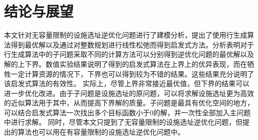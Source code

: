 \documentclass[UTF8]{article}
\begin{document}
%
%


\section{结论与展望}

本文针对无容量限制的设施选址逆优化问题进行了建模分析，提出了使用行生成算法得到最优解以及通过对整数规划进行线性松弛而得到启发式方法。分析表明对于行生成算法中的子问题采取不同的计算方法可以分别得到逆优化问题的最优解以及解的上下界。数值实验结果说明了得到的启发式算法在上界上的优异表现，而在牺牲一定计算资源的情况下，下界也可以得到较为不错的结果。这些结果充分说明了该启发式算法的有效性。
实际上，尽管上界非常接近最优值，但下界的结果可以进一步优化改进。由于子问题是设施选址的原问题，可以将求解设施选址更为高效的近似算法用于其中，从而提高下界解的质量。子问题是最具有优化空间的地方，可以结合启发式算法一次找出多个目标函数小于0的解，并一次性全部加入主问题中进行求解。
同时，尽管本文只提到了无容量限制的设施选址逆优化问题，但提出的算法也可以用在有容量限制的设施选址逆优化问题中。
\end{document}
